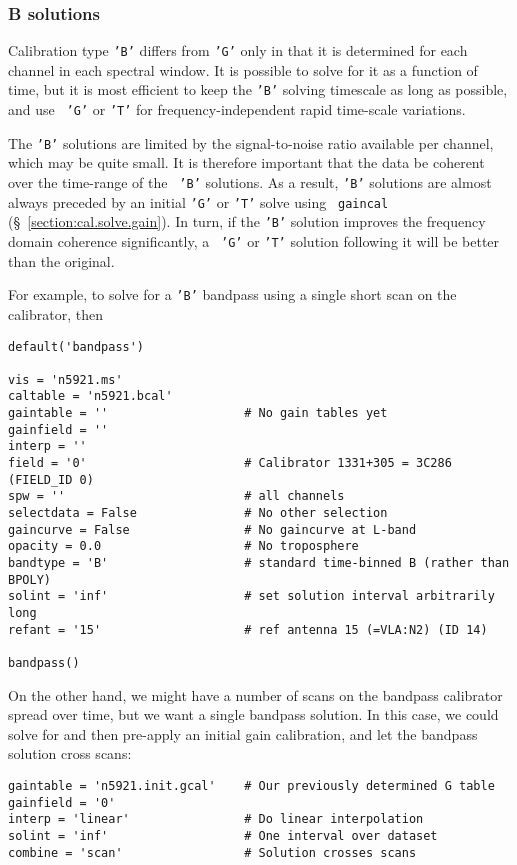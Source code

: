 \subsubsection{B solutions}
\label{section:cal.solve.band.b}

Calibration type {\tt 'B'} differs from {\tt 'G'} only in that it is
determined for each channel in each spectral window.  It is possible
to solve for it as a function of time, but it is most efficient to
keep the {\tt 'B'} solving timescale as long as possible, and use {\tt
'G'} or {\tt 'T'} for frequency-independent rapid  time-scale variations.

The {\tt 'B'} solutions are limited by the signal-to-noise ratio
available per channel, which may be quite small.  It is therefore
important that the data be coherent over the time-range of the {\tt
'B'} solutions.  As a result, {\tt 'B'} solutions are almost always
preceded by an initial {\tt 'G'} or {\tt 'T'} solve using {\tt
gaincal} (\S~\ref{section:cal.solve.gain}).  In turn, if the {\tt 'B'}
solution improves the frequency domain coherence significantly, a {\tt
'G'} or {\tt 'T'} solution following it will be better than the
original.

For example, to solve for a {\tt 'B'} bandpass using a single short
scan on the calibrator, then
\small
\begin{verbatim}
default('bandpass')

vis = 'n5921.ms'
caltable = 'n5921.bcal'
gaintable = ''                   # No gain tables yet
gainfield = ''
interp = ''
field = '0'                      # Calibrator 1331+305 = 3C286 (FIELD_ID 0)
spw = ''                         # all channels
selectdata = False               # No other selection
gaincurve = False                # No gaincurve at L-band
opacity = 0.0                    # No troposphere
bandtype = 'B'                   # standard time-binned B (rather than BPOLY)
solint = 'inf'                   # set solution interval arbitrarily long
refant = '15'                    # ref antenna 15 (=VLA:N2) (ID 14)

bandpass()
\end{verbatim}
\normalsize

On the other hand, we might have a number of scans on the bandpass
calibrator spread over time, but we want a single bandpass solution.
In this case, we could solve for and then pre-apply an initial gain
calibration, and let the bandpass solution cross scans:
\small
\begin{verbatim}
gaintable = 'n5921.init.gcal'    # Our previously determined G table
gainfield = '0'
interp = 'linear'                # Do linear interpolation
solint = 'inf'                   # One interval over dataset
combine = 'scan'                 # Solution crosses scans
\end{verbatim}
\normalsize

